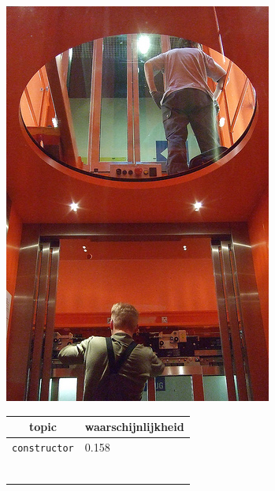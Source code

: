 \begin{figure}[h]
    \centering
    \begin{minipage}[t]{.5\linewidth}
    \centering
    \vspace{0pt}
    \includegraphics[width=\textwidth]{Images/LDA/2506703854.jpg}
    \end{minipage}\hfill
    \begin{minipage}[t]{.5\textwidth}
    \centering
    \vspace{0pt}
    \begin{tabularx}{\textwidth}{cl}
            topic                           & waarschijnlijkheid\\
            \hline
            \texttt{constructor} & 0.158\\
            \begin{tabular}{c}

\end{tabular}
\end{tabularx}
\end{minipage}
\end{figure}
